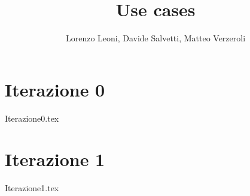 \documentclass[
		a4paper,
		cleardoublepage=empty,
		headings=twolinechapter,
		numbers=autoenddot,
]{article}
\title{Use cases}
\author{Lorenzo Leoni, Davide Salvetti, Matteo Verzeroli}
\begin{document}
	\maketitle
	\section{Iterazione 0}
	{Iterazione0.tex}
	
	\clearpage
	\section{Iterazione 1}
	{Iterazione1.tex}
	
	
\end{document}
